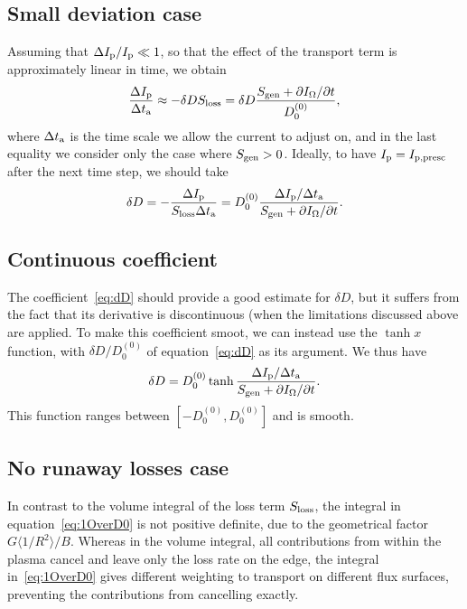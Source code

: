 \documentclass{notes}
\begin{document}
	\subsection{Small deviation case}
	Assuming that $\Delta I_{\rm p}/I_{\rm p}\ll 1$, so that the effect of
	the transport term is approximately linear in time, we obtain
	\begin{equation}\label{eq:dD}
		\frac{\Delta I_{\rm p}}{\Delta t_{\rm a}}\approx
			-\delta D S_{\rm loss} = \delta D\frac{S_{\rm gen}+\partial I_\Omega/\partial t}{D_0^{(0)}},
	\end{equation}
	where $\Delta t_{\rm a}$ is the time scale we allow the current to adjust
	on, and in the last equality we consider only the case where $S_{\rm gen}>0$.
	Ideally, to have $I_{\rm p} = I_{\rm p,presc}$ after the next time step, we
	should take
	\begin{equation}
		\delta D = -\frac{\Delta I_{\rm p}}{S_{\rm loss}\Delta t_{\rm a}} = D_0^{(0)} \frac{\Delta I_{\rm p}/\Delta t_{\rm a}}{S_{\rm gen}+\partial I_\Omega/\partial t}.
	\end{equation}

	\subsection{Continuous coefficient}
	The coefficient~\eqref{eq:dD} should provide a good estimate for $\delta D$,
	but it suffers from the fact that its derivative is discontinuous (when the
	limitations discussed above are applied. To make this coefficient smoot, we
	can instead use the $\tanh{x}$ function, with $\delta D/D_0^{(0)}$ of
	equation~\eqref{eq:dD} as its argument. We thus have
	\begin{equation}\label{eq:dD_tanh}
		\delta D = D_0^{(0)}\tanh\frac{\Delta I_{\rm p}/\Delta t_{\rm a}}{S_{\rm gen}+\partial I_\Omega/\partial t}.
	\end{equation}
	This function ranges between $[-D_0^{(0)}, D_0^{(0)}]$ and is smooth.


	\subsection{No runaway losses case}
	In contrast to the volume integral of the loss term $S_{\rm loss}$, the
	integral in equation~\eqref{eq:1OverD0} is not positive definite, due to the
	geometrical factor $G\langle 1/R^2\rangle/B$. Whereas in the volume
	integral, all contributions from within the plasma cancel and leave only the
	loss rate on the edge, the integral in~\eqref{eq:1OverD0} gives different
	weighting to transport on different flux surfaces, preventing the
	contributions from cancelling exactly.
\end{document}
